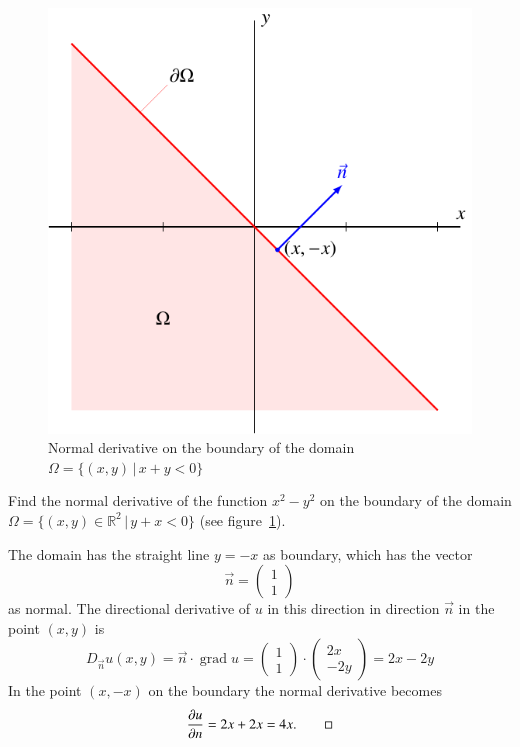 \begin{beispiel}
\begin{figure}
\centering
\includegraphics{2-classification/images/oblique.pdf}
\caption{Normal derivative on the boundary of the domain
$\Omega=\{(x,y)\,|\, x+y<0\}$
\label{conditions:oblique}}
\end{figure}
Find the normal derivative of the function
$x^2-y^2$
on the boundary of the domain
$\Omega=\{(x,y)\in\mathbb R^2\,|\,y+x<0\}$
(see figure~\ref{conditions:oblique}).

The domain has the straight line
$y=-x$ as boundary, which has the vector
\[
\vec n=\begin{pmatrix}1\\1\end{pmatrix}
\]
as normal.
The directional derivative of $u$ in this direction in direction $\vec{n}$
in the point $(x,y)$ is
\[
D_{\vec n}u(x,y)=\vec n\cdot\operatorname{grad}u
=\begin{pmatrix}1\\1\end{pmatrix}\cdot\begin{pmatrix}2x\\-2y\end{pmatrix}
=2x-2y
\]
In the point $(x,-x)$ on the boundary the normal derivative becomes
\[
\frac{\partial u}{\partial n}
=
2x+2x=4x.
\qedhere
\]
\end{beispiel}

